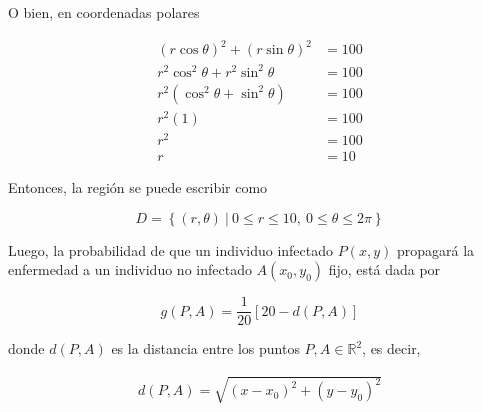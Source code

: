 \documentclass[12pt]{exam}
\begin{document}
\begin{questions}
\begin{enumerate}[a)]
    O bien, en coordenadas polares

    \begin{align*}
      (r\cos{\theta})^2+(r\sin{\theta})^2 &=100 \\
      r^2\cos^2{\theta}+r^2\sin^2{\theta} &=100 \\
      r^2(\cos^2{\theta}+\sin^2{\theta}) &=100 \\
      r^2(1) &=100 \\
      r^2 & =100 \\
      r&=10
    \end{align*}

    Entonces, la región se puede escribir como

    \[
    D=\left\{(r,\theta)~|~0 \leq r\leq 10, ~0\leq \theta \leq 2\pi \right\}
    \]

    Luego, la probabilidad de que un individuo infectado $P(x,y)$ propagará la enfermedad a un individuo no infectado $A(x_0,y_0)$ fijo, está dada por

    \begin{equation*}
      g(P,A)=\frac{1}{20}\left[2 0 -d \left(P,A\right)\right]
    \end{equation*}

    donde $d(P,A)$ es la distancia entre los puntos $P,A \in \mathbb{R}^2$, es decir,

    \begin{align*}
      d(P,A) = \sqrt{(x-x_0)^2+(y-y_0)^2}
    \end{align*}




\end{enumerate}
\end{questions}
\end{document}
